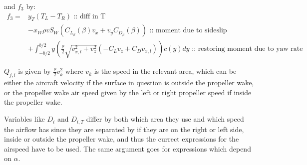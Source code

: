 and $f_3$ by:
\begin{equation}\begin{split}
    f_3 =& 
    y_T \left( T_L - T_R \right) \text{ :: diff in T}\\
    &- x_W \rho v S_W  \left( C_{L_\beta}(\beta) v_x + v_y C_{D_\beta}(\beta) \right) \text{ :: moment due to sideslip} \\
    &+  \int_{-b/2}^{b/2} y \left( \frac{\rho}{2} \sqrt{v_{x,l}^2 + v_z^2} \left( -C_L v_z + C_D v_{x,l} \right) \right) c(y) dy \text{ :: restoring moment due to yaw rate}
\end{split}\end{equation}

$Q_{j,i}$ is given by $\frac{\rho}{2} v_k^2$ where $v_k$ is the speed in the relevant area, which can be either the aircraft velocity if the surface in question is outside the propeller wake, or the propeller wake air speed given by the left or right propeller speed if inside the propeller wake.

Variables like $D_i$ and $D_{i,T}$ differ by both which area they use and which speed the airflow has since they are separated by if they are on the right or left side, inside or outside the propeller wake, and thus the currect expressions for the airspeed have to be used.
The same argument goes for expressions which depend on $\alpha$.